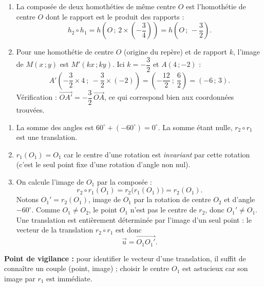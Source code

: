 \documentclass[11pt]{article}
\newcommand{\cle}[1]{{\popxbold\color{popdark}#1}}
\begin{document}
\begin{corrige}
\begin{enumerate}
\item La composée de deux homothéties de même centre $O$ est l'homothétie de centre $O$ dont le rapport est le produit des rapports :
\[ h_2\circ h_1 = h\left(O\,;\,2\times\left(-\dfrac{3}{4}\right)\right)=h\left(O\,;\,-\dfrac{3}{2}\right). \]
\item Pour une homothétie de centre $O$ (origine du repère) et de rapport $k$, l'image de $M(x\,;y)$ est $M'(kx\,;ky)$. Ici $k=-\dfrac{3}{2}$ et $A(4\,;-2)$ :
\[ A'\left(-\dfrac{3}{2}\times 4\ ;\ -\dfrac{3}{2}\times(-2)\right)=\left(-\dfrac{12}{2}\ ;\ \dfrac{6}{2}\right)=(-6\,;\,3). \]
Vérification : $\overrightarrow{OA'}=-\dfrac{3}{2}\,\overrightarrow{OA}$, ce qui correspond bien aux coordonnées trouvées.
\end{enumerate}
\end{corrige}

\begin{corrige}
\begin{enumerate}
\item La somme des angles est $60^{\circ}+(-60^{\circ})=0^{\circ}$. La somme étant nulle, $r_2\circ r_1$ est une \cle{translation}.
\item $r_1(O_1)=O_1$ car le centre d'une rotation est \emph{invariant} par cette rotation (c'est le seul point fixe d'une rotation d'angle non nul).
\item On calcule l'image de $O_1$ par la composée :
\[ r_2\circ r_1(O_1)=r_2\big(r_1(O_1)\big)=r_2(O_1). \]
Notons $O_1'=r_2(O_1)$, image de $O_1$ par la rotation de centre $O_2$ et d'angle $-60^{\circ}$. Comme $O_1\neq O_2$, le point $O_1$ n'est pas le centre de $r_2$, donc $O_1'\neq O_1$. Une translation est entièrement déterminée par l'image d'un seul point : le vecteur de la translation $r_2\circ r_1$ est donc
\[ \vec{u}=\overrightarrow{O_1O_1'}. \]
\end{enumerate}
\textbf{Point de vigilance :} pour identifier le vecteur d'une translation, il suffit de connaître un couple (point, image) ; choisir le centre $O_1$ est astucieux car son image par $r_1$ est immédiate.
\end{corrige}
\end{document}
